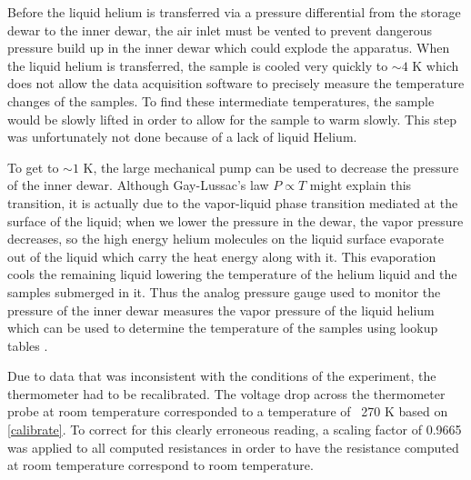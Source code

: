 \documentclass[prl,twocolumn,superscriptaddress,floatfix]{revtex4}
\begin{document}
Before the liquid helium is transferred via a pressure differential from the storage dewar to the inner dewar,
the air inlet must be vented to prevent dangerous pressure build up in the inner dewar which could explode the apparatus.
When the liquid helium is transferred, the sample is cooled very quickly to $\sim 4$ K which does not allow the data acquisition software
to precisely measure the temperature changes of the samples.
To find these intermediate temperatures, the sample would be slowly lifted in order to allow for the sample to warm slowly. This step was unfortunately not done because of a lack of liquid Helium.


To get to $\sim 1$ K, the large mechanical pump can be used to decrease the 
pressure of the inner dewar.
Although Gay-Lussac's law $P \propto T$ might explain this transition, it is 
actually due to the vapor-liquid phase transition mediated at the surface of the liquid; 
when we lower the pressure in the dewar, the vapor pressure decreases, so the high energy helium molecules on the liquid surface  evaporate out of the liquid which carry the heat energy along with it. This evaporation cools the remaining liquid lowering the temperature of the helium liquid and the samples submerged in it. 
Thus the analog pressure gauge used to monitor the pressure of the inner dewar measures the vapor pressure of the liquid helium which can be used to determine the temperature of the samples using lookup tables \cite{White2001-jq}.

Due to data that was inconsistent with the conditions of the experiment, the thermometer had to be recalibrated. The voltage drop across the thermometer probe at room temperature corresponded to a temperature of ~270 K based on \eqref{calibrate}. To correct for this clearly erroneous reading, a scaling factor of 0.9665 was applied to all computed resistances in order to have the resistance computed at room temperature correspond to room temperature.
\end{document}

